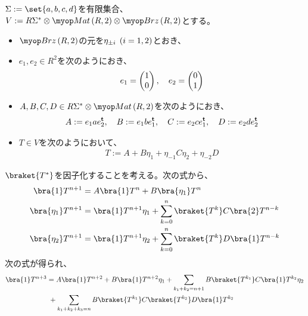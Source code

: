 {	$\Sigma:=\set{a,b,c,d}$を有限集合、
	$V:=R\Sigma^*\otimes\Mat\lr{R,2}\otimes\Brz\lr{R,2}$とする。
	\begin{itemize}\setlength{\itemsep}{-1mm} %
		\item $\Brz\lr{R,2}$の元を$\eta_{\pm i}\;\left({i=1,2}\right)$とおき、
		\item $e_1,e_2\in R^2$を次のようにおき、
		\begin{equation*}\begin{split}
			e_1 = \begin{pmatrix}{1}\\{0}\end{pmatrix},\quad e_2 = \begin{pmatrix}{0}\\{1}\end{pmatrix}
		\end{split}\end{equation*}
		\item $A,B,C,D\in R\Sigma^*\otimes\Mat\lr{R,2}$を次のようにおき、
		\begin{equation*}\begin{split}
			A := e_1ae_2^{\mathbf{t}} ,\quad B := e_1be_1^{\mathbf{t}}
			,\quad C := e_2ce_1^{\mathbf{t}},\quad D := e_2de_2^{\mathbf{t}}
		\end{split}\end{equation*}
		\item $T\in V$を次のようにおいて、
		\begin{equation}\label{eq:Tの定義}\begin{split}
			T := A + B\eta_1 + \eta_{-1}C\eta_2 + \eta_{-2}D
		\end{split}\end{equation}
	\end{itemize} %
	$\braket{T^*}$を因子化することを考える。次の式から、
	\begin{equation*}\begin{split}
		\bra{1}T^{n+1} &= A\bra{1}T^n + B\bra{\eta_1}T^n \\
		\bra{\eta_1}T^{n+1} &= \bra{1}T^{n+1}\eta_1 
			+ \sum_{k=0}^n \braket{T^k}C\bra{2}T^{n-k} \\
		\bra{\eta_2}T^{n+1} &= \bra{1}T^{n+1}\eta_2 
			+ \sum_{k=0}^n \braket{T^k}D\bra{1}T^{n-k} \\
	\end{split}\end{equation*}
	次の式が得られ、
	\begin{equation*}\begin{split}
		\bra{1}T^{n+3} &= A\bra{1}T^{n+2} + B\bra{1}T^{n+2}\eta_1
			+ \sum_{k_1+k_2=n+1} B\braket{T^{k_1}}C\bra{1}T^{k_2}\eta_2 \\
			&\; + \sum_{k_1+k_2+k_3=n} B\braket{T^{k_1}}C\braket{T^{k_2}}
				D\bra{1}T^{k_2}
	\end{split}\end{equation*}
}
